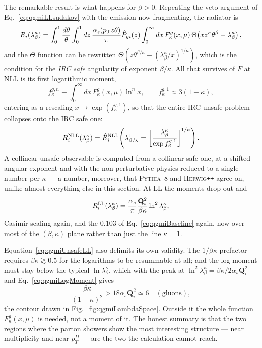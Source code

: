 The remarkable result is what happens for \(\beta>0\). Repeating the veto argument of
Eq.~\ref{eq:qgmiLLsudakov} with the emission now fragmenting, the radiator is
\begin{equation}
	R_i(\lambda^\kappa_\beta) = \int_0^1\frac{d\theta}{\theta}\int_0^1 dz\,
	\frac{\alpha_s(p_{\rm T}z\theta)}{\pi}\hat{P}_{gi}(z)
	\int_0^\infty dx\,F^g_\kappa(x,\mu)\,
	\Theta\!\left(x z^\kappa\theta^\beta - \lambda^\kappa_\beta\right) ,
	\label{eq:qgmiUnsafeRadiator}
\end{equation}
and the \(\Theta\) function can be rewritten
\(\Theta(z\theta^{\beta/\kappa}-(\lambda^\kappa_\beta/x)^{1/\kappa})\), which is the
condition for the \emph{IRC safe} angularity of exponent \(\beta/\kappa\). All that
survives of \(F\) at NLL is its first logarithmic moment,
\begin{equation}
	f^{g,n}_\kappa \equiv \int_0^\infty dx\,F^g_\kappa(x,\mu)\ln^n x ,
	\qquad
	f^{g,1}_\kappa \approx 3(1-\kappa) ,
	\label{eq:qgmiLogMoment}
\end{equation}
entering as a rescaling \(x\to\exp(f^{g,1}_\kappa)\), so that the entire IRC unsafe
problem collapses onto the IRC safe one:
\begin{equation}
	R_i^{\rm NLL}(\lambda^\kappa_\beta)
	= \hat{R}_i^{\rm NLL}\!\left(
	\lambda^1_{\beta/\kappa} =
	\left[\frac{\lambda^\kappa_\beta}{\exp f^{g,1}_\kappa}\right]^{1/\kappa}\right) .
	\label{eq:qgmiCollapse}
\end{equation}
A collinear-unsafe observable is computed from a collinear-safe one, at a shifted
angular exponent and with the non-perturbative physics reduced to a single number per
\(\kappa\) --- a number, moreover, that \textsc{Pythia}~8 and \textsc{Herwig}\texttt{++} agree on, unlike
almost everything else in this section. At LL the moments drop out and
\begin{equation}
	R_i^{\rm LL}(\lambda^\kappa_\beta) = \frac{\alpha_s}{\pi}
	\frac{\mathbf{Q}_i^2}{\beta\kappa}\ln^2\lambda^\kappa_\beta ,
	\label{eq:qgmiUnsafeLL}
\end{equation}
Casimir scaling again, and the \(0.103\) of Eq.~\ref{eq:qgmiBaseline} again, now over
most of the \((\beta,\kappa)\) plane rather than just the line \(\kappa=1\).

Equation~\ref{eq:qgmiUnsafeLL} also delimits its own validity. The \(1/\beta\kappa\)
prefactor requires \(\beta\kappa\gtrsim0.5\) for the logarithms to be resummable at
all; and the log moment must stay below the typical \(\ln\lambda^\kappa_\beta\),
which with the peak at \(\ln^2\lambda^\kappa_\beta=\beta\kappa/2\alpha_s\mathbf{Q}_i^2\)
and Eq.~\ref{eq:qgmiLogMoment} gives
\begin{equation}
	\frac{\beta\kappa}{(1-\kappa)^2} > 18\alpha_s\mathbf{Q}_i^2 \simeq 6
	\quad(\text{gluons}) ,
	\label{eq:qgmiBarrier}
\end{equation}
the contour drawn in Fig.~\ref{fig:qgmiLambdaSpace}. Outside it the whole function
\(F^g_\kappa(x,\mu)\) is needed, not a moment of it. The honest summary is that the
two regions where the parton showers show the most interesting structure --- near
multiplicity and near \(p_T^D\) --- are the two the calculation cannot reach.

